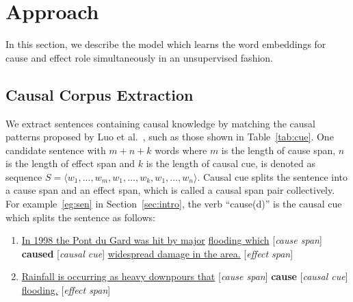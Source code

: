 \section{Approach}
\label{sec:approach}

In this section, we describe the model which learns the word embeddings 
for cause and effect role simultaneously in an unsupervised fashion. 

\subsection{Causal Corpus Extraction}
We extract sentences containing causal knowledge by matching the 
causal patterns proposed by Luo et al.~, 
such as those shown in Table~\ref{tab:cue}. 
One candidate sentence with $m+n+k$ words where $m$ is the length of cause span, $n$ is the length of effect span and $k$ is the length of causal cue, is denoted as sequence $S = \langle w_1, ..., w_m, w_1, \dots, w_k, w_1, \dots, w_n\rangle$. Causal cue splits the sentence into a cause span and an effect span, 
which is called a causal span pair collectively.  
For example~\ref{eg:sen} in Section~\ref{sec:intro}, 
the verb ``cause(d)'' is the causal cue which splits the sentence 
as follows:\\

\begin{enumerate}[(1)]
\item \underline{In 1998 the Pont du Gard was hit by major}  \underline{flooding which} [\emph{cause span}] \textbf{caused}  [\emph{causal cue}] \underline{widespread damage in the area.} [\emph{effect span}]\\
\item \underline{Rainfall is occurring as heavy downpours that} [\emph{cause span}] {\bf cause} [\emph{causal cue}] \underline{flooding.} [\emph{effect span}]
\end{enumerate}

